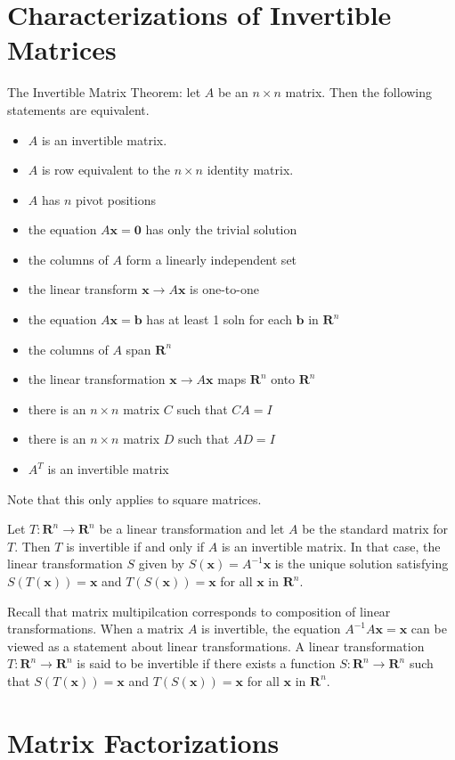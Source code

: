 \documentclass[../linalg.tex]{subfiles}
\begin{document}
\section{Characterizations of Invertible Matrices}
The Invertible Matrix Theorem: let $A$ be an $n\times n$ matrix. Then the following statements are equivalent.
\begin{itemize}
    \item $A$ is an invertible matrix.
    \item $A$ is row equivalent to the $n\times n$ identity matrix.
    \item $A$ has $n$ pivot positions 
    \item the equation $A\textbf{x}=\textbf{0}$ has only the trivial solution 
    \item the columns of $A$ form a linearly independent set 
    \item the linear transform $\textbf{x}\rightarrow A\textbf{x}$ is one-to-one 
    \item the equation $A\textbf{x}=\textbf{b}$ has at least 1 soln for each $\textbf{b}$ in $\textbf{R}^n$
    \item the columns of $A$ span $\textbf{R}^n$
    \item the linear transformation $\textbf{x}\rightarrow A\textbf{x}$ maps $\textbf{R}^n$ onto $\textbf{R}^n$
    \item there is an $n\times n$ matrix $C$ such that $CA=I$
    \item there is an $n\times n$ matrix $D$ such that $AD=I$
    \item $A^T$ is an invertible matrix 
\end{itemize}
Note that this only applies to square matrices.

\begin{theorem}
    Let $T:\textbf{R}^n\rightarrow \textbf{R}^n$ be a linear transformation and let $A$ be the standard matrix for $T$. Then $T$ is invertible if and only if $A$ is an invertible matrix.
    In that case, the linear transformation $S$ given by $S(\textbf{x})=A^{-1}\textbf{x}$ is the unique solution satisfying $S(T(\textbf{x}))=\textbf{x}$ and $T(S(\textbf{x}))=\textbf{x}$ for all $\textbf{x}$ in $\textbf{R}^n$.
\end{theorem}

Recall that matrix multipilcation corresponds to composition of linear transformations. When a matrix $A$ is invertible, the equation $A^{-1}A\textbf{x}=\textbf{x}$ can be viewed as a statement 
about linear transformations. A linear transformation $T:\textbf{R}^n\rightarrow \textbf{R}^n$ is said to be invertible if there exists a function $S:\textbf{R}^n\rightarrow \textbf{R}^n$ such that $S(T(\textbf{x}))=\textbf{x}$ and $T(S(\textbf{x}))=\textbf{x}$ for all $\textbf{x}$ in $\textbf{R}^n$.



\section{Matrix Factorizations}
\end{document}
